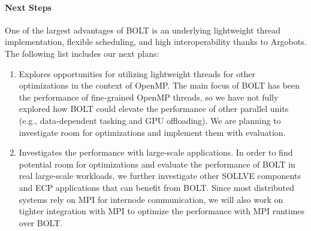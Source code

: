 \paragraph{Next Steps}

One of the largest advantages of BOLT is an underlying lightweight
thread implementation, flexible scheduling, and high interoperability
thanks to Argobots. The following list includes our next plans:

\begin{enumerate}

\item Explores opportunities for utilizing lightweight threads for
other optimizations in the context of OpenMP.  The main focus of BOLT
has been the performance of fine-grained OpenMP threads, so we have
not fully explored how BOLT could elevate the performance of other
parallel units (e.g., data-dependent tasking and GPU offloading). We
are planning to investigate room for optimizations and implement them
with evaluation.

\item Investigates the performance with large-scale applications.
In order to find potential room for optimizations and evaluate the
performance of BOLT in real large-scale workloads, we further
investigate other SOLLVE components and ECP applications that can benefit from BOLT.  Since most distributed systems rely on MPI for internode
communication, we will also work on tighter integration with MPI to
optimize the performance with MPI runtimes over BOLT.

\end{enumerate}

